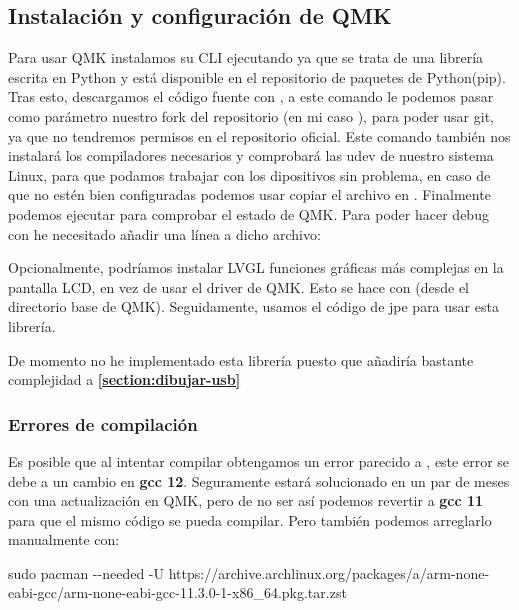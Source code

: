 \subsection{Instalación y configuración de QMK}
Para usar QMK\cite{qmk} instalamos su CLI ejecutando  ya que se trata de una librería escrita en Python y está disponible en el repositorio de paquetes de Python(pip). \newline
Tras esto, descargamos el código fuente con , a este comando le podemos pasar como parámetro nuestro fork del repositorio (en mi caso ), para poder usar git, ya que no tendremos permisos en el repositorio oficial. Este comando también nos instalará los compiladores necesarios y comprobará las udev de nuestro sistema Linux, para que podamos trabajar con los dipositivos sin problema, en caso de que no estén bien configuradas podemos usar copiar el archivo  en . Finalmente podemos ejecutar  para comprobar el estado de QMK. \newline
Para poder hacer debug con  he necesitado añadir una línea a dicho archivo: \newline
{} \newline

\hr
Opcionalmente, podríamos instalar LVGL\cite{lvgl} funciones gráficas más complejas en la pantalla LCD, en vez de usar el driver de QMK. Esto se hace con \newline
{} (desde el directorio base de QMK). Seguidamente, usamos el código de jpe\cite{lvgl-jpe} para usar esta librería. \newline

De momento no he implementado esta librería puesto que añadiría bastante complejidad a \textbf{\ref{section:dibujar-usb} }
\hr

    \subsubsection{Errores de compilación}
    Es posible que al intentar compilar obtengamos un error parecido a \newline
    , este error se debe a un cambio en \textbf{gcc 12}. Seguramente estará solucionado en un par de meses con una actualización en QMK, pero de no ser así podemos revertir a \textbf{gcc 11} para que el mismo código se pueda compilar. Pero también podemos arreglarlo manualmente con: \newline
    \begin{multicli}
        \cliarrow sudo pacman -{}-needed -U https://archive.archlinux.org/packages/a/arm-none-eabi-gcc/arm-none-eabi-gcc-11.3.0-1-x86\_64.pkg.tar.zst
    \end{multicli}

